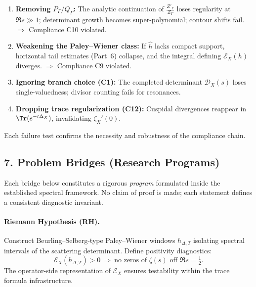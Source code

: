 \begin{enumerate}[label=(\alph*)]
\item \textbf{Removing $P_\Gamma/Q_\Gamma$:}  
The analytic continuation of $\frac{Z'_\Gamma}{Z_\Gamma}$ loses regularity at $\Re s\gg1$; determinant growth becomes super-polynomial; contour shifts fail.  
$\Rightarrow$ Compliance C10 violated.

\item \textbf{Weakening the Paley–Wiener class:}  
If $\widehat{h}$ lacks compact support, horizontal tail estimates (Part~6) collapse, and the integral defining $\mathcal{E}_X(h)$ diverges.  
$\Rightarrow$ Compliance C9 violated.

\item \textbf{Ignoring branch choice (C1):}  
The completed determinant $\mathscr{D}_X(s)$ loses single-valuedness; divisor counting fails for resonances.

\item \textbf{Dropping trace regularization (C12):}  
Cuspidal divergences reappear in $\Tr(e^{-t\Delta_X})$, invalidating $\zeta_X'(0)$.
\end{enumerate}
Each failure test confirms the necessity and robustness of the compliance chain.\relax\hspace{0pt}

\subsection*{7. Problem Bridges (Research Programs)}\relax\hspace{0pt}
\label{subsec:tfc8-bridges}\relax\hspace{0pt}

Each bridge below constitutes a rigorous \emph{program} formulated inside the established spectral framework.  
No claim of proof is made; each statement defines a consistent diagnostic invariant.

\paragraph{Riemann Hypothesis (RH).}  
Construct Beurling–Selberg-type Paley–Wiener windows $h_{\Delta,T}$ isolating spectral intervals of the scattering determinant.  
Define positivity diagnostics:
\[
\mathcal{E}_X(h_{\Delta,T})>0\ \Rightarrow\ 
\text{no zeros of }\zeta(s)\text{ off }\Re s=\tfrac12.
\]
The operator-side representation of $\mathcal{E}_X$ ensures testability within the trace formula infrastructure.  

